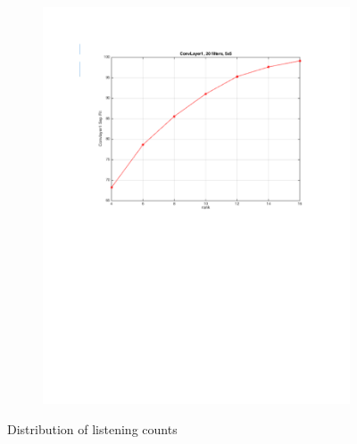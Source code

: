 \documentclass{article} %
\begin{document}
\begin{figure}[h]
\begin{subfigure}[b]{0.40\textwidth}
    \includegraphics[width=\textwidth]{images/imagesCNN_page6.pdf}
    \caption{}
  \end{subfigure}
  \caption{Distribution of listening counts}
  \label{fig:user_artist_distribution}
\end{figure}
\end{document}
